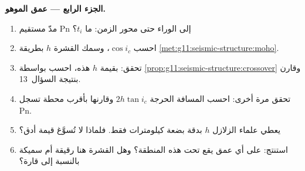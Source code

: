 \begin{problem}
\medskip
\noindent\textbf{الجزء الرابع --- عمق الموهو.}
\begin{enumerate}[resume]
  \item مدّ مستقيم Pn إلى الوراء حتى محور الزمن: ما 
        $t_i$؟
  \item احسب $\cos i_c$، وسمك القشرة $h$ بطريقة
        \cref{met:g11:seismic-structure:moho}.
  \item تحقق: بقيمة $h$ هذه، احسب  بواسطة
        \cref{prop:g11:seismic-structure:crossover} وقارن بنتيجة
        السؤال~13.
  \item تحقق مرة أخرى: احسب المسافة الحرجة $2h\tan i_c$ وقارنها
        بأقرب محطة تسجل Pn.
  \item يعطي علماء الزلازل $h$ بدقة بضعة كيلومترات فقط. فلماذا
        لا تُسوَّغ قيمة أدق؟
  \item استنتج: على أي عمق يقع  تحت هذه المنطقة؟ وهل
        القشرة هنا رقيقة أم سميكة بالنسبة إلى قارة؟
\end{enumerate}
\end{problem}
